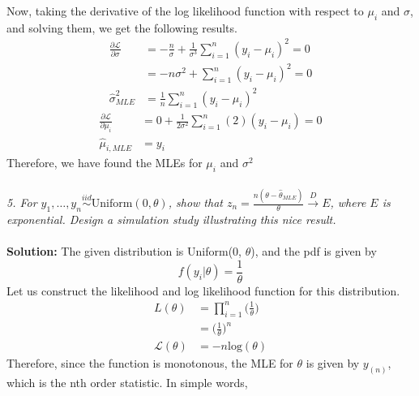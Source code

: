 \documentclass[11pt]{article}
\begin{document}
Now, taking the derivative of the log likelihood function with respect to $\mu_{i}$ and $\sigma$, and solving them, we get the following results.
\begin{equation}
  \nonumber
  \begin{aligned}
    \frac{\partial \mathcal{L}}{\partial \sigma} & = -\frac{n}{\sigma} + \frac{1}{\sigma^{3}}\sum_{i = 1}^{n}(y_{i} - \mu_{i})^{2} = 0\\
    & = -n \sigma^{2} + \sum_{i = 1}^{n} (y_{i} - \mu_{i})^{2} = 0\\
    \hat{\sigma}_{MLE}^{2} & = \frac{1}{n}\sum_{i = 1}^{n}(y_{i} - \mu_{i})^{2}
  \end{aligned}
\end{equation}
\begin{equation}
  \nonumber
  \begin{aligned}
    \frac{\partial \mathcal{L}}{\partial \mu_{i}} & = 0 + \frac{1}{2 \sigma^{2}} \sum_{i = 1}^{n}(2)(y_{i} - \mu_{i}) = 0\\
    \hat{\mu}_{i,MLE} & = y_{i}
  \end{aligned}
\end{equation}
Therefore, we have found the MLEs for $\mu_{i}$ and  $\sigma^{2}$\\ \\
\noindent \emph{5. For $y_{1}, \dots, y_{n} \overset{iid}{\sim} \text{Uniform}(0, \theta)$, show that $z_{n} = \frac{n(\theta -  \hat{\theta}_{MLE})}{\theta} \xrightarrow{D} E$, where $E$ is exponential. Design a simulation study illustrating this nice result.}\\ \\
\textbf{Solution:} The given distribution is Uniform(0, $\theta$), and the pdf is given by
\begin{equation}
  \nonumber
  f(y_{i} | \theta) = \frac{1}{\theta}
\end{equation}
Let us construct the likelihood and log likelihood function for this distribution.
\begin{equation}
  \nonumber
  \begin{aligned}
    L(\theta) & = \prod_{i = 1}^{n} \bigg(\frac{1}{\theta}\bigg)\\
    & = \bigg(\frac{1}{\theta}\bigg)^{n}\\
    \mathcal{L}(\theta) & = -n\text{log}(\theta)
  \end{aligned}
\end{equation}
Therefore, since the function is monotonous, the MLE for $\theta$ is given by $y_{(n)}$, which is the nth order statistic. In simple words,
\end{document}
